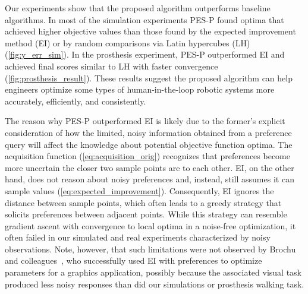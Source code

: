 Our experiments show that the proposed algorithm outperforms baseline
algorithms. In most of the simulation experiments PES-P found optima that
achieved higher objective values than those found by the expected improvement
method (EI) or by random comparisons via Latin hypercubes (LH)
(\cref{fig:y_err_sim}). In the prosthesis experiment, PES-P outperformed EI and
achieved final scores similar to LH with faster convergence
(\cref{fig:prosthesis_result}). These results suggest the proposed algorithm can
help engineers optimize some types of human-in-the-loop robotic systems more
accurately, efficiently, and consistently. 

The reason why PES-P outperformed EI is likely due to the former's explicit
consideration of how the limited, noisy information obtained from a preference
query will affect the knowledge about potential objective function optima. The
acquisition function (\cref{eq:acquisition_orig}) recognizes that preferences
become more uncertain the closer two sample points are to each other. EI, on the
other hand, does not reason about noisy preferences and, instead, still assumes
it can sample values (\cref{eq:expected_improvement}). Consequently, EI ignores
the distance between sample points, which often leads to a greedy strategy that
solicits preferences between adjacent points. While this strategy can resemble
gradient ascent with convergence to local optima in a noise-free optimization,
it often failed in our simulated and real experiments characterized by noisy
observations. Note, however, that such limitations were not observed by Brochu
and colleagues~\citep{eric2008active}, who successfully used EI with preferences
to optimize parameters for a graphics application, possibly because the
associated visual task produced less noisy responses than did our simulations or
prosthesis walking task. 


